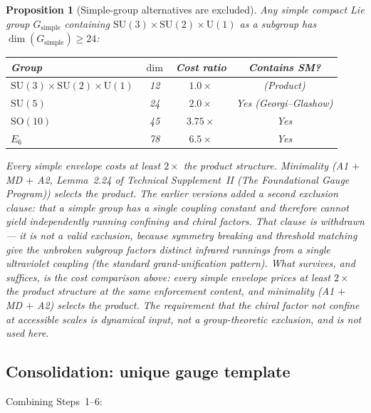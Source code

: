\documentclass[11pt]{article}
\newtheorem{proposition}[theorem]{Proposition}
\theoremstyle{definition}
\newcommand{\SU}{\mathrm{SU}}
\newcommand{\U}{\mathrm{U}}
\newcommand{\TSII}{Technical Supplement~II (\emph{The Foundational Gauge Program})}
\begin{document}
\begin{proposition}[Simple-group alternatives are excluded]\label{prop:no_simple}
Any simple compact Lie group $G_{\mathrm{simple}}$ containing
$\SU(3) \times \SU(2) \times \U(1)$ as a subgroup has
$\dim(G_{\mathrm{simple}}) \ge 24$:

\smallskip
\begin{center}
\small
\begin{tabular}{@{}lccc@{}}
\toprule
\textbf{Group} & $\dim$ & \textbf{Cost ratio} & \textbf{Contains SM?} \\
\midrule
$\SU(3) \times \SU(2) \times \U(1)$ & 12 & $1.0\times$ & (Product) \\
$\SU(5)$   & 24 & $2.0\times$ & Yes (Georgi--Glashow) \\
$\mathrm{SO}(10)$ & 45 & $3.75\times$ & Yes \\
$E_6$ & 78 & $6.5\times$ & Yes \\
\bottomrule
\end{tabular}
\end{center}

\smallskip\noindent Every simple envelope costs at least $2\times$ the
product structure.  Minimality (A1 $+$ MD $+$ A2,
Lemma~2.24 of \TSII{}) selects the product.
The earlier versions added a second exclusion clause: that a simple
group has a single coupling constant and therefore cannot yield
independently running confining and chiral factors.  That clause is
withdrawn --- it is not a valid exclusion, because symmetry breaking
and threshold matching give the unbroken subgroup factors distinct
infrared runnings from a single ultraviolet coupling (the standard
grand-unification pattern).  What survives, and suffices, is the cost
comparison above: every simple envelope prices at least $2\times$ the
product structure at the same enforcement content, and minimality
(A1 $+$ MD $+$ A2) selects the product.  The requirement that the
chiral factor not confine at accessible scales is dynamical input, not
a group-theoretic exclusion, and is not used here.
\end{proposition}


\subsection{Consolidation: unique gauge template}
\label{sec:gauge_consolidation}

Combining Steps~1--6:
\end{document}
